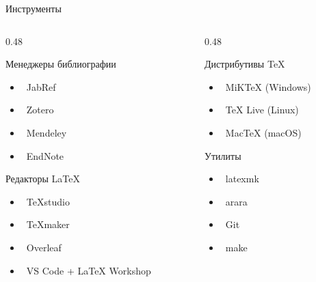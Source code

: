 \documentclass[aspectratio=169, 12pt]{beamer}
\begin{document}
\begin{frame}{Инструменты}
  \begin{columns}[T]
    \begin{column}{0.48\textwidth}
      \begin{block}{Менеджеры библиографии}
        \begin{itemize}
          \item \faDatabase\ JabRef
          \item \faBookmark\ Zotero
          \item \faBook\ Mendeley
          \item \faPaperclip\ EndNote
        \end{itemize}
      \end{block}
      
      \begin{block}{Редакторы LaTeX}
        \begin{itemize}
          \item \faEdit\ TeXstudio
          \item \faCode\ TeXmaker
          \item \faCloud\ Overleaf
          \item \faTerminal\ VS Code + LaTeX Workshop
        \end{itemize}
      \end{block}
    \end{column}
    
    \begin{column}{0.48\textwidth}
      \begin{block}{Дистрибутивы TeX}
        \begin{itemize}
          \item \faWindows\ MiKTeX (Windows)
          \item \faLinux\ TeX Live (Linux)
          \item \faApple\ MacTeX (macOS)
        \end{itemize}
      \end{block}
      
      \begin{block}{Утилиты}
        \begin{itemize}
          \item \faSyncAlt\ latexmk
          \item \faFileCode\ arara
          \item \faGitAlt\ Git
          \item \faTerminal\ make
        \end{itemize}
      \end{block}
    \end{column}
  \end{columns}
\end{frame}
\end{document}
